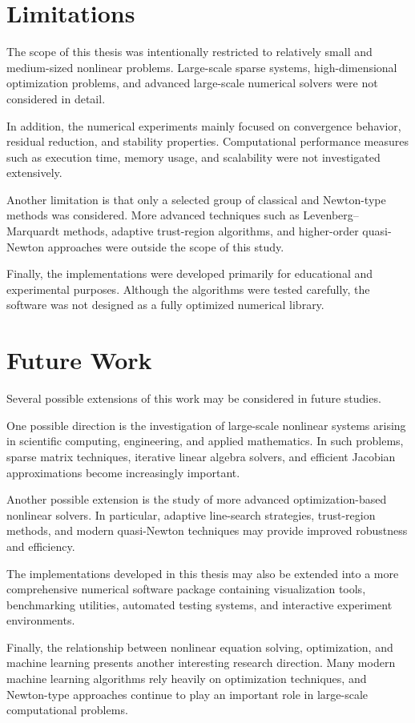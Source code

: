 \section{Limitations}

The scope of this thesis was intentionally restricted to relatively small and medium-sized nonlinear problems. Large-scale sparse systems, high-dimensional optimization problems, and advanced large-scale numerical solvers were not considered in detail.

In addition, the numerical experiments mainly focused on convergence behavior, residual reduction, and stability properties. Computational performance measures such as execution time, memory usage, and scalability were not investigated extensively.

Another limitation is that only a selected group of classical and Newton-type methods was considered. More advanced techniques such as Levenberg--Marquardt methods, adaptive trust-region algorithms, and higher-order quasi-Newton approaches were outside the scope of this study.

Finally, the implementations were developed primarily for educational and experimental purposes. Although the algorithms were tested carefully, the software was not designed as a fully optimized numerical library.

\section{Future Work}

Several possible extensions of this work may be considered in future studies.

One possible direction is the investigation of large-scale nonlinear systems arising in scientific computing, engineering, and applied mathematics. In such problems, sparse matrix techniques, iterative linear algebra solvers, and efficient Jacobian approximations become increasingly important.

Another possible extension is the study of more advanced optimization-based nonlinear solvers. In particular, adaptive line-search strategies, trust-region methods, and modern quasi-Newton techniques may provide improved robustness and efficiency.

The implementations developed in this thesis may also be extended into a more comprehensive numerical software package containing visualization tools, benchmarking utilities, automated testing systems, and interactive experiment environments.

Finally, the relationship between nonlinear equation solving, optimization, and machine learning presents another interesting research direction. Many modern machine learning algorithms rely heavily on optimization techniques, and Newton-type approaches continue to play an important role in large-scale computational problems.
